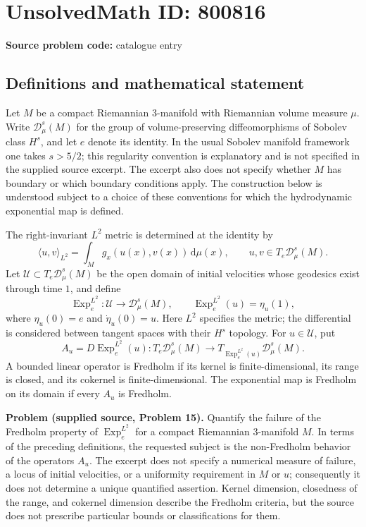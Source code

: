 \documentclass[11pt]{article}
\begin{document}
\section*{UnsolvedMath ID: 800816}
\textbf{Source problem code:} catalogue entry
\subsection{Definitions and mathematical statement}
Let \(M\) be a compact Riemannian \(3\)-manifold with Riemannian volume measure \(\mu\). Write \(\mathscr D^s_\mu(M)\) for the group of volume-preserving diffeomorphisms of Sobolev class \(H^s\), and let \(e\) denote its identity. In the usual Sobolev manifold framework one takes \(s>5/2\); this regularity convention is explanatory and is not specified in the supplied source excerpt. The excerpt also does not specify whether \(M\) has boundary or which boundary conditions apply. The construction below is understood subject to a choice of these conventions for which the hydrodynamic exponential map is defined.

The right-invariant \(L^2\) metric is determined at the identity by
\[
\langle u,v\rangle_{L^2}=\int_M g_x(u(x),v(x))\,\mathrm d\mu(x),
\qquad u,v\in T_e\mathscr D^s_\mu(M).
\]
Let \(\mathcal U\subset T_e\mathscr D^s_\mu(M)\) be the open domain of initial velocities whose geodesics exist through time \(1\), and define
\[
\operatorname{Exp}^{L^2}_e:\mathcal U\longrightarrow\mathscr D^s_\mu(M),
\qquad \operatorname{Exp}^{L^2}_e(u)=\eta_u(1),
\]
where \(\eta_u(0)=e\) and \(\dot\eta_u(0)=u\). Here \(L^2\) specifies the metric; the differential is considered between tangent spaces with their \(H^s\) topology. For \(u\in\mathcal U\), put
\[
A_u=D\operatorname{Exp}^{L^2}_e(u):T_e\mathscr D^s_\mu(M)\longrightarrow T_{\operatorname{Exp}^{L^2}_e(u)}\mathscr D^s_\mu(M).
\]
A bounded linear operator is Fredholm if its kernel is finite-dimensional, its range is closed, and its cokernel is finite-dimensional. The exponential map is Fredholm on its domain if every \(A_u\) is Fredholm.

\textbf{Problem (supplied source, Problem 15).} Quantify the failure of the Fredholm property of \(\operatorname{Exp}^{L^2}_e\) for a compact Riemannian \(3\)-manifold \(M\). In terms of the preceding definitions, the requested subject is the non-Fredholm behavior of the operators \(A_u\). The excerpt does not specify a numerical measure of failure, a locus of initial velocities, or a uniformity requirement in \(M\) or \(u\); consequently it does not determine a unique quantified assertion. Kernel dimension, closedness of the range, and cokernel dimension describe the Fredholm criteria, but the source does not prescribe particular bounds or classifications for them.
\end{document}
